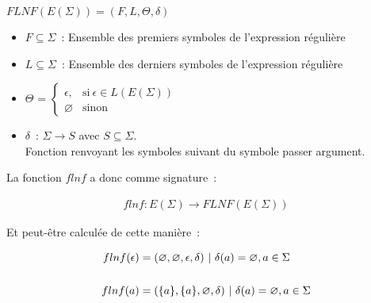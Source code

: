 \documentclass[12pt]{article}
\begin{document}
\vphantom{}

\begin{center}
    \(FLNF(E(\Sigma)) = (F, L, \Theta, \delta)\)

    \begin{itemize}
        \item[\textbullet] \(F \subseteq \Sigma\)~: Ensemble des premiers
            symboles de l'expression régulière

            \vphantom{}

        \item[\textbullet] \(L \subseteq \Sigma\)~: Ensemble des derniers
            symboles de l'expression régulière

            \vphantom{}

        \item[\textbullet] \(\Theta\) =
            \(
            \begin{cases}
                \epsilon,   & \text{si}~ \epsilon \in L(E(\Sigma)) \\
                \varnothing & \text{sinon}
            \end{cases}
            \)

            \vphantom{}

        \item[\textbullet] \(\delta\)~: \(\Sigma \to S\) avec \(S \subseteq
            \Sigma\). \\
            Fonction renvoyant les symboles suivant du symbole passer argument.
    \end{itemize}
\end{center}

La fonction \(flnf\) a donc comme signature~:

\begin{align}
    flnf: E(\Sigma) \to FLNF(E(\Sigma))
\end{align}

Et peut-être calculée de cette manière~:

\begin{align}
    flnf(\epsilon) & = (\varnothing, \varnothing, \epsilon, \delta) ~|~ \delta(a) = \varnothing, a \in \Sigma \\
    \vphantom{} \notag                                                                                        \\
    flnf(a)        & = (\{a\}, \{a\}, \varnothing, \delta) ~|~ \delta(a) = \varnothing, a
    \in \Sigma
\end{align}
\end{document}
